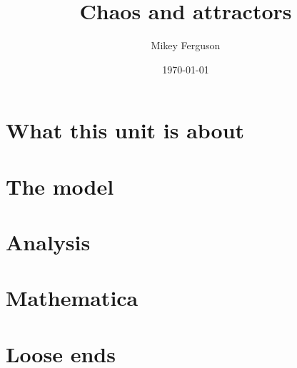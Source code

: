 \documentclass[11pt]{article}
\title{Chaos and attractors}
\author{Mikey Ferguson}
\date{\today}
\begin{document}
\maketitle
\tableofcontents
\bigskip

\section{What this unit is about}

\section{The model}

\section{Analysis}

\section{Mathematica}

\section{Loose ends}
\end{document}
